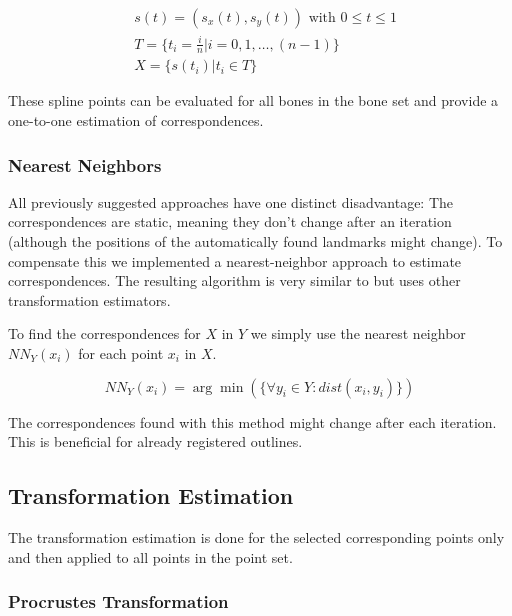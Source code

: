 \documentclass[pdftex,12pt,a4paper]{report}
\begin{document}
\begin{equation}
\label{eq:registration-spline}
\begin{split}
& s(t) = ( s_x(t), s_y(t) ) \text{ with } 0 \leq t \leq 1 \\
& T = \{ t_i=\frac{i}{n} | i=0, 1, \dots, (n-1) \} \\
& X = \{ s(t_i) | t_i \in T \}
\end{split}
\end{equation}

These spline points can be evaluated for all bones in the bone set and provide a one-to-one estimation of correspondences.

\subsubsection{Nearest Neighbors}

All previously suggested approaches have one distinct disadvantage: The correspondences are static, meaning they don't
change after an iteration (although the positions of the automatically found landmarks might change). To compensate this
we implemented a nearest-neighbor approach to estimate correspondences. The resulting algorithm is very similar to
\cite{besl1992method} but uses other transformation estimators.

To find the correspondences for $X$ in $Y$ we simply use the nearest neighbor $NN_Y(x_i)$ for each point $x_i$ in $X$.

\begin{equation}
NN_Y(x_i) = \arg\min(\{ \forall y_i \in Y: dist(x_i, y_i) \})
\end{equation}

The correspondences found with this method might change after each iteration. This is beneficial for already registered
outlines.

\subsection{Transformation Estimation}

The transformation estimation is done for the selected corresponding points only and then applied to all points in
the point set.

\subsubsection{Procrustes Transformation}
\label{subsub:procrustes}
\end{document}
